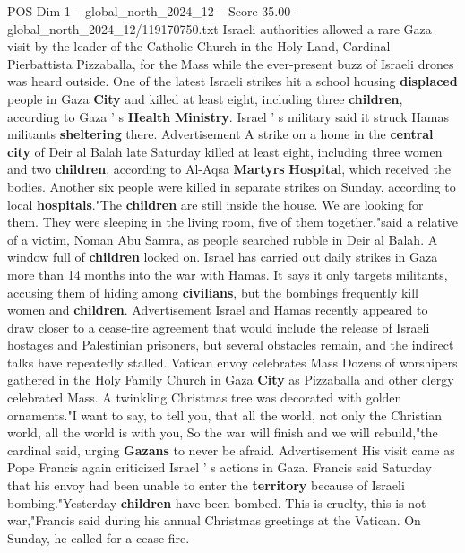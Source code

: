 \begin{textsample}{POS Dim 1 – global\_north\_2024\_12 – Score 35.00 – global\_north\_2024\_12/119170750.txt}  \label{ex:f1_pos_227}
Israeli authorities allowed a rare Gaza visit by the leader of the Catholic Church in the Holy Land, Cardinal Pierbattista Pizzaballa, for the Mass while the ever-present buzz of Israeli drones was heard outside.
One of the latest Israeli strikes hit a school housing \textbf{displaced} people in Gaza \textbf{City} and killed at least eight, including three \textbf{children}, according to Gaza ' s \textbf{Health} \textbf{Ministry}.
Israel ' s military said it struck Hamas militants \textbf{sheltering} there.
Advertisement A strike on a home in the \textbf{central} \textbf{city} of Deir al Balah late Saturday killed at least eight, including three women and two \textbf{children}, according to Al-Aqsa \textbf{Martyrs} \textbf{Hospital}, which received the bodies.
Another six people were killed in separate strikes on Sunday, according to local \textbf{hospitals}."The \textbf{children} are still inside the house.
We are looking for them.
They were sleeping in the living room, five of them together,"said a relative of a victim, Noman Abu Samra, as people searched rubble in Deir al Balah.
A window full of \textbf{children} looked on.
Israel has carried out daily strikes in Gaza more than 14 months into the war with Hamas.
It says it only targets militants, accusing them of hiding among \textbf{civilians}, but the bombings frequently kill women and \textbf{children}.
Advertisement Israel and Hamas recently appeared to draw closer to a cease-fire agreement that would include the release of Israeli hostages and Palestinian prisoners, but several obstacles remain, and the indirect talks have repeatedly stalled.
Vatican envoy celebrates Mass Dozens of worshipers gathered in the Holy Family Church in Gaza \textbf{City} as Pizzaballa and other clergy celebrated Mass.
A twinkling Christmas tree was decorated with golden ornaments."I want to say, to tell you, that all the world, not only the Christian world, all the world is with you, So the war will finish and we will rebuild,"the cardinal said, urging \textbf{Gazans} to never be afraid.
Advertisement His visit came as Pope Francis again criticized Israel ' s actions in Gaza.
Francis said Saturday that his envoy had been unable to enter the \textbf{territory} because of Israeli bombing."Yesterday \textbf{children} have been bombed.
This is cruelty, this is not war,"Francis said during his annual Christmas greetings at the Vatican.
On Sunday, he called for a cease-fire.

\end{textsample}
